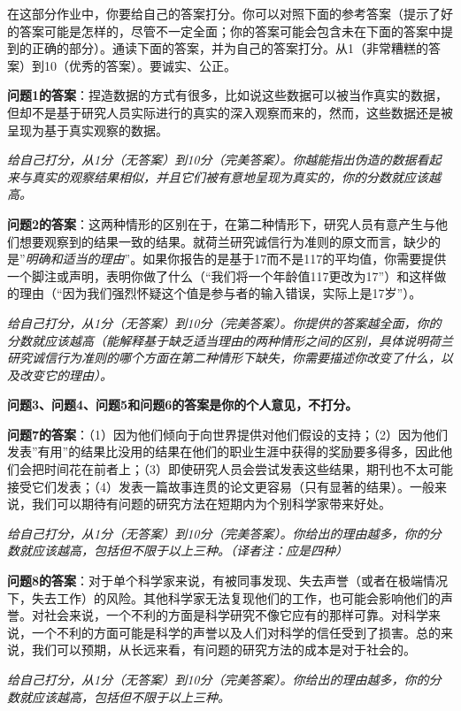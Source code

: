 \documentclass[
  letterpaper,
  DIV=11,
  numbers=noendperiod]{scrreprt}
\begin{document}
在这部分作业中，你要给自己的答案打分。你可以对照下面的参考答案（提示了好的答案可能是怎样的，尽管不一定全面；你的答案可能会包含未在下面的答案中提到的正确的部分）。通读下面的答案，并为自己的答案打分。从1（非常糟糕的答案）到10（优秀的答案）。要诚实、公正。

\textbf{问题1的答案}：捏造数据的方式有很多，比如说这些数据可以被当作真实的数据，但却不是基于研究人员实际进行的真实的深入观察而来的，然而，这些数据还是被呈现为基于真实观察的数据。

\emph{给自己打分，从1分（无答案）到10分（完美答案）。你越能指出伪造的数据看起来与真实的观察结果相似，并且它们被有意地呈现为真实的，你的分数就应该越高。}

\textbf{问题2的答案}：这两种情形的区别在于，在第二种情形下，研究人员有意产生与他们想要观察到的结果一致的结果。就荷兰研究诚信行为准则的原文而言，缺少的是''\emph{明确和适当的理由}''。如果你报告的是基于17而不是117的平均值，你需要提供一个脚注或声明，表明你做了什么（``我们将一个年龄值117更改为17''）和这样做的理由（``因为我们强烈怀疑这个值是参与者的输入错误，实际上是17岁''）。

\emph{给自己打分，从1分（无答案）到10分（完美答案）。你提供的答案越全面，你的分数就应该越高（能解释基于缺乏适当理由的两种情形之间的区别，具体说明荷兰研究诚信行为准则的哪个方面在第二种情形下缺失，你需要描述你改变了什么，以及改变它的理由）。}

\textbf{问题3、问题4、问题5和问题6的答案是你的个人意见，不打分。}

\textbf{问题7的答案}：（1）因为他们倾向于向世界提供对他们假设的支持；（2）因为他们发表''有用''的结果比没用的结果在他们的职业生涯中获得的奖励要多得多，因此他们会把时间花在前者上；（3）即使研究人员会尝试发表这些结果，期刊也不太可能接受它们发表；（4）发表一篇故事连贯的论文更容易（只有显著的结果）。一般来说，我们可以期待有问题的研究方法在短期内为个别科学家带来好处。

\emph{给自己打分，从1分（无答案）到10分（完美答案）。你给出的理由越多，你的分数就应该越高，包括但不限于以上三种。（译者注：应是四种）}

\textbf{问题8的答案}：对于单个科学家来说，有被同事发现、失去声誉（或者在极端情况下，失去工作）的风险。其他科学家无法复现他们的工作，也可能会影响他们的声誉。对社会来说，一个不利的方面是科学研究不像它应有的那样可靠。对科学来说，一个不利的方面可能是科学的声誉以及人们对科学的信任受到了损害。总的来说，我们可以预期，从长远来看，有问题的研究方法的成本是对于社会的。

\emph{给自己打分，从1分（无答案）到10分（完美答案）。你给出的理由越多，你的分数就应该越高，包括但不限于以上三种。}
\end{document}
